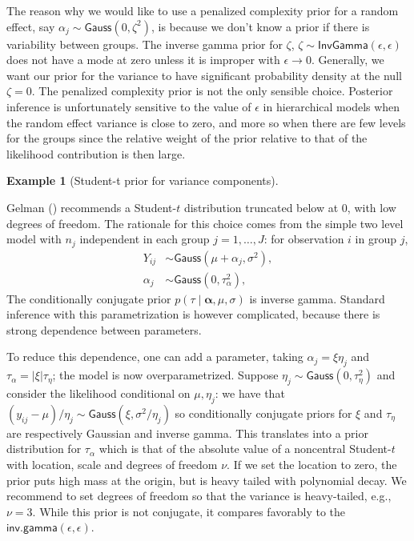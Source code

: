 \documentclass[
  11pt,
  letterpaper,
]{scrbook}
\theoremstyle{definition}
\theoremstyle{plain}
\theoremstyle{plain}
\theoremstyle{definition}
\newtheorem{example}{Example}[chapter]
\theoremstyle{definition}
\theoremstyle{remark}
\begin{document}
The reason why we would like to use a penalized complexity prior for a
random effect, say \(\alpha_j \sim \mathsf{Gauss}(0, \zeta^2)\), is
because we don't know a prior if there is variability between groups.
The inverse gamma prior for \(\zeta\),
\(\zeta \sim \mathsf{InvGamma}(\epsilon, \epsilon)\) does not have a
mode at zero unless it is improper with \(\epsilon \to 0\). Generally,
we want our prior for the variance to have significant probability
density at the null \(\zeta=0\). The penalized complexity prior is not
the only sensible choice. Posterior inference is unfortunately sensitive
to the value of \(\epsilon\) in hierarchical models when the random
effect variance is close to zero, and more so when there are few levels
for the groups since the relative weight of the prior relative to that
of the likelihood contribution is then large.

\begin{example}[Student-t prior for variance
components]\protect\hypertarget{exm-random-effect-variance}{}\label{exm-random-effect-variance}

Gelman () recommends a Student-\(t\)
distribution truncated below at \(0\), with low degrees of freedom. The
rationale for this choice comes from the simple two level model with
\(n_j\) independent in each group \(j=1, \ldots, J\): for observation
\(i\) in group \(j\), \begin{align*}
Y_{ij} &\sim \mathsf{Gauss}(\mu + \alpha_j, \sigma^2),\\
\alpha_j &\sim \mathsf{Gauss}(0, \tau^2_\alpha),
\end{align*} The conditionally conjugate prior
\(p(\tau \mid \boldsymbol{\alpha}, \mu, \sigma)\) is inverse gamma.
Standard inference with this parametrization is however complicated,
because there is strong dependence between parameters.

To reduce this dependence, one can add a parameter, taking
\(\alpha_j = \xi \eta_j\) and \(\tau_\alpha=|\xi|\tau_{\eta}\); the
model is now overparametrized. Suppose
\(\eta_j \sim \mathsf{Gauss}(0, \tau^2_\eta)\) and consider the
likelihood conditional on \(\mu, \eta_j\): we have that
\((y_{ij} - \mu)/\eta_j \sim \mathsf{Gauss}(\xi, \sigma^2/\eta_j)\) so
conditionally conjugate priors for \(\xi\) and \(\tau_\eta\) are
respectively Gaussian and inverse gamma. This translates into a prior
distribution for \(\tau_\alpha\) which is that of the absolute value of
a noncentral Student-\(t\) with location, scale and degrees of freedom
\(\nu\). If we set the location to zero, the prior puts high mass at the
origin, but is heavy tailed with polynomial decay. We recommend to set
degrees of freedom so that the variance is heavy-tailed, e.g.,
\(\nu=3\). While this prior is not conjugate, it compares favorably to
the \(\mathsf{inv. gamma}(\epsilon, \epsilon)\).

\end{example}
\end{document}
